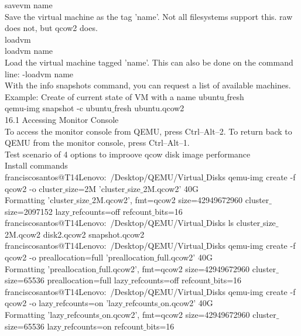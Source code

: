 \documentclass[11pt, a4paper, oneside]{article}
\theoremstyle{definition}
\begin{document}
    savevm name\\

Save the virtual machine as the tag 'name'. Not all filesystems support this. raw does not, but qcow2 does.\\
loadvm\\

    loadvm name\\

Load the virtual machine tagged 'name'. This can also be done on the command line: -loadvm name\\

With the info snapshots command, you can request a list of available machines. \\

Example: Create of current state of VM with a name ubuntu$\_$fresh\\

qemu-img snapshot -c ubuntu$\_$fresh ubuntu.qcow2\\

16.1 Accessing Monitor Console\\

To access the monitor console from QEMU, press Ctrl–Alt–2. To return back to QEMU from the monitor console, press Ctrl–Alt–1. \\
Test scenario of 4 options to improove qcow disk image performance\\
Install commands\\
franciscosantos@T14Lenovo:~/Desktop/QEMU/Virtual$\_$Disks qemu-img create -f qcow2 -o cluster$\_$size=2M 'cluster$\_$size$\_$2M.qcow2' 40G\\
Formatting 'cluster$\_$size$\_$2M.qcow2', fmt=qcow2 size=42949672960 cluster$\_$size=2097152 lazy$\_$refcounts=off refcount$\_$bits=16\\
franciscosantos@T14Lenovo:~/Desktop/QEMU/Virtual$\_$Disks ls
cluster$\_$size$\_$2M.qcow2  disk2.qcow2  snapshot.qcow2
franciscosantos@T14Lenovo:~/Desktop/QEMU/Virtual$\_$Disks qemu-img create -f qcow2 -o preallocation=full 'preallocation$\_$full.qcow2' 40G\\
Formatting 'preallocation$\_$full.qcow2', fmt=qcow2 size=42949672960 cluster$\_$size=65536 preallocation=full lazy$\_$refcounts=off refcount$\_$bits=16\\
franciscosantos@T14Lenovo:~/Desktop/QEMU/Virtual$\_$Disks qemu-img create -f qcow2 -o lazy$\_$refcounts=on 'lazy$\_$refcounts$\_$on.qcow2' 40G\\
Formatting 'lazy$\_$refcounts$\_$on.qcow2', fmt=qcow2 size=42949672960 cluster$\_$size=65536 lazy$\_$refcounts=on refcount$\_$bits=16\\
\end{document}

